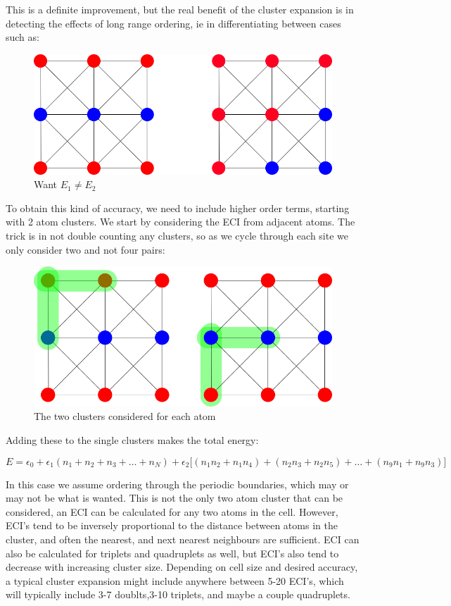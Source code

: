 \documentclass[12pt]{article}
\begin{document}
This is a definite improvement, but the real benefit of the cluster expansion is in detecting the effects of long range ordering, ie in differentiating between cases such as:

\begin{figure}[H]
	\centering
	\includegraphics[scale=0.5]{./images/ordered.png}
	\caption*{Want $E_1\neq E_2$}
\end{figure}

To obtain this kind of accuracy, we need to include higher order terms, starting with 2 atom clusters.  We start by considering the ECI from adjacent atoms. The trick is in not double counting any clusters, so as we cycle through each site we only consider two and not four pairs:  

\begin{figure}[H]
	\centering
	\includegraphics[scale=0.5]{./images/doublets.png}
	\caption*{The two clusters considered for each atom}
\end{figure}

Adding these to the single clusters makes the total energy: 

\[
E = \epsilon_0 + \epsilon_1 (n_1 + n_2 +n_3 + \dots + n_N ) + \epsilon_2 \bigg[(n_1n_2 + n_1n_4) + (n_2n_3 + n_2n_5) + \dots + (n_9n_1+n_9n_3)\bigg]
\]


In this case we assume ordering through the periodic boundaries, which may or may not be what is wanted. This is not the only two atom cluster that can be considered, an ECI can be calculated for any two atoms in the cell.  However, ECI's tend to be inversely proportional to the distance between atoms in the cluster, and often the nearest, and next nearest neighbours are sufficient.  ECI can also be calculated for triplets and quadruplets as well, but ECI's also tend to decrease with increasing cluster size.  Depending on cell size and desired accuracy, a typical cluster expansion might include anywhere between 5-20 ECI's, which will typically include 3-7 doublts,3-10 triplets, and maybe a couple quadruplets.  \\
\end{document}
